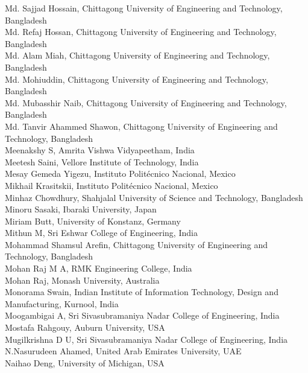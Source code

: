 \documentclass[11pt,oneside]{book}
\begin{document}
\begin{description}
          Md. Sajjad Hossain, Chittagong University of Engineering and Technology, Bangladesh\\
          Md. Refaj Hossan, Chittagong University of Engineering and Technology, Bangladesh\\
          Md. Alam Miah, Chittagong University of Engineering and Technology, Bangladesh\\
          Md. Mohiuddin, Chittagong University of Engineering and Technology, Bangladesh\\
          Md. Mubasshir Naib, Chittagong University of Engineering and Technology, Bangladesh\\
          Md. Tanvir Ahammed Shawon, Chittagong University of Engineering and Technology, Bangladesh\\
          Meenakshy S, Amrita Vishwa Vidyapeetham, India\\
          Meetesh Saini, Vellore Institute of Technology, India\\
          Mesay Gemeda Yigezu, Instituto Politécnico Nacional, Mexico\\
          Mikhail Krasitskii, Instituto Politécnico Nacional, Mexico\\
          Minhaz Chowdhury, Shahjalal University of Science and Technology, Bangladesh\\
          Minoru Sasaki, Ibaraki University, Japan\\
          Miriam Butt, University of Konstanz, Germany\\
          Mithun M, Sri Eshwar College of Engineering, India\\
          Mohammad Shamsul Arefin, Chittagong University of Engineering and Technology, Bangladesh\\
          Mohan Raj M A, RMK Engineering College, India\\
          Mohan Raj, Monash University, Australia\\
          Monorama Swain, Indian Institute of Information Technology, Design and Manufacturing, Kurnool, India\\
          Moogambigai A, Sri Sivasubramaniya Nadar College of Engineering, India\\
          Mostafa Rahgouy, Auburn University, USA\\
          Mugilkrishna D U, Sri Sivasubramaniya Nadar College of Engineering, India\\
          N.Nasurudeen Ahamed, United Arab Emirates University, UAE\\
          Naihao Deng, University of Michigan, USA\\

\end{description}
\end{document}
